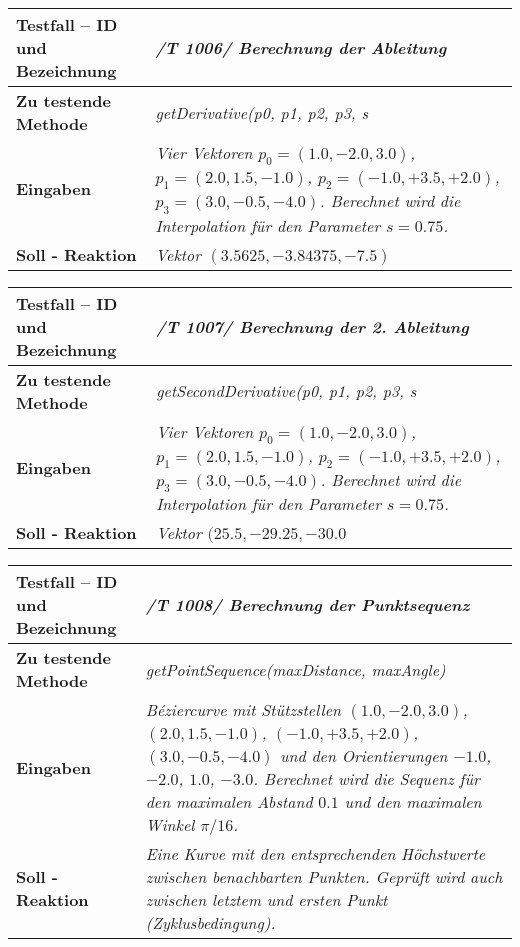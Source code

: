 \begin{longtable}{|p{7cm}|p{10cm}|}
\hline
\textbf{Testfall -- ID und Bezeichnung} & \textit{ /T 1006/ Berechnung der Ableitung} \\
\hline
\textbf{Zu testende Methode} &  \textit{getDerivative(p0, p1, p2, p3, s} \\
\hline
\textbf{Eingaben} & \textit{Vier Vektoren $p_0 = (1.0, -2.0, 3.0)$,
$p_1 = (2.0, 1.5, -1.0)$, $p_2 = (-1.0, +3.5, +2.0)$, $p_3 = (3.0, -0.5, -4.0)$. 
Berechnet wird die Interpolation für den Parameter $s = 0.75$.}\\
\hline
\textbf{Soll - Reaktion} & \textit{Vektor $(3.5625,-3.84375, -7.5)$}\\
\hline
\end{longtable}

\begin{longtable}{|p{7cm}|p{10cm}|}
\hline
\textbf{Testfall -- ID und Bezeichnung} & \textit{ /T 1007/ Berechnung der 2. Ableitung} \\
\hline
\textbf{Zu testende Methode} &  \textit{getSecondDerivative(p0, p1, p2, p3, s} \\
\hline
\textbf{Eingaben} & \textit{Vier Vektoren $p_0 = (1.0, -2.0, 3.0)$,
$p_1 = (2.0, 1.5, -1.0)$, $p_2 = (-1.0, +3.5, +2.0)$, $p_3 = (3.0, -0.5, -4.0)$. 
Berechnet wird die Interpolation für den Parameter $s = 0.75$.}\\
\hline
\textbf{Soll - Reaktion} & \textit{Vektor $(25.5,-29.25, -30.0$}\\
\hline
\end{longtable}

\begin{longtable}{|p{7cm}|p{10cm}|}
\hline
\textbf{Testfall -- ID und Bezeichnung} & \textit{ /T 1008/ Berechnung der Punktsequenz} \\
\hline
\textbf{Zu testende Methode} &  \textit{getPointSequence(maxDistance, maxAngle)} \\
\hline
\textbf{Eingaben} & \textit{Béziercurve mit Stützstellen $(1.0, -2.0, 3.0)$,
$(2.0, 1.5, -1.0)$, $(-1.0, +3.5, +2.0)$, $(3.0, -0.5, -4.0)$ und
den Orientierungen $-1.0$, $-2.0$, $1.0$, $-3.0$.
Berechnet wird die Sequenz für den maximalen Abstand $0.1$ und den maximalen Winkel $\pi/16$.}\\
\hline
\textbf{Soll - Reaktion} & \textit{Eine Kurve mit den entsprechenden Höchstwerte zwischen benachbarten
 Punkten. Geprüft wird auch zwischen letztem und ersten Punkt (Zyklusbedingung). } \\
\hline
\end{longtable}


